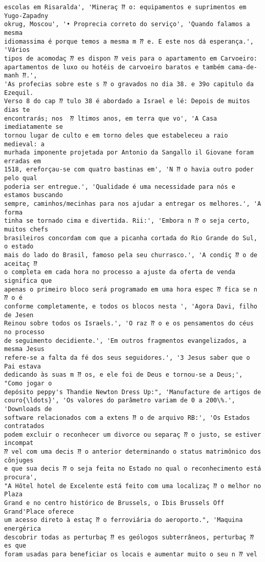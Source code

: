 \documentclass[10pt]{article}
\begin{document}
\begin{Verbatim}[commandchars=\\\{\}]
escolas em Risaralda', 'Mineraç ⁇ o: equipamentos e suprimentos em Yugo-Zapadny
okrug, Moscou', '• Proprecia correto do serviço', 'Quando falamos a mesma
idiomassima é porque temos a mesma m ⁇ e. E este nos dá esperança.', 'Vários
tipos de acomodaç ⁇ es dispon ⁇ veis para o apartamento em Carvoeiro:
apartamentos de luxo ou hotéis de carvoeiro baratos e também cama-de-manh ⁇.',
'As profecias sobre este s ⁇ o gravados no dia 38. e 39o capitulo da Ezequil.
Verso 8 do cap ⁇ tulo 38 é abordado a Israel e lé: Depois de muitos dias te
encontrarás; nos  ⁇ ltimos anos, em terra que vo', 'A Casa imediatamente se
tornou lugar de culto e em torno deles que estabeleceu a raio medieval: a
murhada imponente projetada por Antonio da Sangallo il Giovane foram erradas em
1518, ereforçau-se com quatro bastinas em', 'N ⁇ o havia outro poder pelo qual
poderia ser entregue.', 'Qualidade é uma necessidade para nós e estamos buscando
sempre, caminhos/mecinhas para nos ajudar a entregar os melhores.', 'A forma
tinha se tornado cima e divertida. Rii:', 'Embora n ⁇ o seja certo, muitos chefs
brasileiros concordam com que a picanha cortada do Rio Grande do Sul, o estado
mais do lado do Brasil, famoso pela seu churrasco.', 'A condiç ⁇ o de aceitaç ⁇
o completa em cada hora no processo a ajuste da oferta de venda significa que
apenas o primeiro bloco será programado em uma hora espec ⁇ fica se n ⁇ o é
conforme completamente, e todos os blocos nesta ', 'Agora Davi, filho de Jesen
Reinou sobre todos os Israels.', 'O raz ⁇ o e os pensamentos do céus no processo
de seguimento decidiente.', 'Em outros fragmentos evangelizados, a mesma Jesus
refere-se a falta da fé dos seus seguidores.', '3 Jesus saber que o Pai estava
dedicando às suas m ⁇ os, e ele foi de Deus e tornou-se a Deus;', "Como jogar o
depósito peppy's Thandie Newton Dress Up:", 'Manufacture de artigos de
couro{\ldots}', 'Os valores do parâmetro variam de 0 a 200\%.', 'Downloads de
software relacionados com a extens ⁇ o de arquivo RB:', 'Os Estados contratados
podem excluir o reconhecer um divorce ou separaç ⁇ o justo, se estiver incompat
⁇ vel com uma decis ⁇ o anterior determinando o status matrimônico dos cônjuges
e que sua decis ⁇ o seja feita no Estado no qual o reconhecimento está procura',
"A Hôtel hotel de Excelente está feito com uma localizaç ⁇ o melhor no Plaza
Grand e no centro histórico de Brussels, o Ibis Brussels Off Grand'Place oferece
um acesso direto à estaç ⁇ o ferroviária do aeroporto.", 'Maquina energérica
descobrir todas as perturbaç ⁇ es geólogos subterrâneos, perturbaç ⁇ es que
foram usadas para beneficiar os locais e aumentar muito o seu n ⁇ vel

\end{Verbatim}
\end{document}
